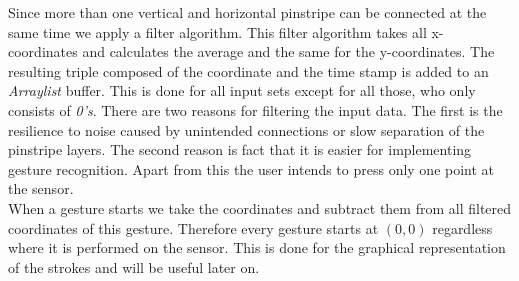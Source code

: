 Since more than one vertical and horizontal pinstripe can be connected at the same time we apply a filter algorithm. This filter algorithm takes all x-coordinates and calculates the average and the same for the y-coordinates. The resulting triple composed of the coordinate and the time stamp is added to an \emph{Arraylist} buffer. This is done for all input sets except for all those, who only consists of \emph{0's}. There are two reasons for filtering the input data. The first is the resilience to noise caused by unintended connections or slow separation of the pinstripe layers. The second reason is fact that it is easier for implementing gesture recognition. Apart from this the user intends to press only one point at the sensor.
\\
When a gesture starts we take the coordinates and subtract them from all filtered coordinates of this gesture. Therefore every gesture starts at $(0,0)$ regardless where it is performed on the sensor. This is done for the graphical representation of the strokes and will be useful later on.
\\ \\

